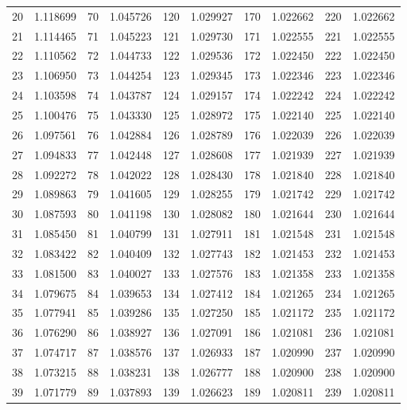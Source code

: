 \documentclass{article}
\begin{document}
\begin{table}
\begin{tabular}{*{10}{c}}
        20 & 1.118699 & 70 & 1.045726 & 120 & 1.029927 & 170 & 1.022662 & 220 & 1.022662 \\
        21 & 1.114465 & 71 & 1.045223 & 121 & 1.029730 & 171 & 1.022555 & 221 & 1.022555 \\
        22 & 1.110562 & 72 & 1.044733 & 122 & 1.029536 & 172 & 1.022450 & 222 & 1.022450 \\
        23 & 1.106950 & 73 & 1.044254 & 123 & 1.029345 & 173 & 1.022346 & 223 & 1.022346 \\
        24 & 1.103598 & 74 & 1.043787 & 124 & 1.029157 & 174 & 1.022242 & 224 & 1.022242 \\
        25 & 1.100476 & 75 & 1.043330 & 125 & 1.028972 & 175 & 1.022140 & 225 & 1.022140 \\
        26 & 1.097561 & 76 & 1.042884 & 126 & 1.028789 & 176 & 1.022039 & 226 & 1.022039 \\
        27 & 1.094833 & 77 & 1.042448 & 127 & 1.028608 & 177 & 1.021939 & 227 & 1.021939 \\
        28 & 1.092272 & 78 & 1.042022 & 128 & 1.028430 & 178 & 1.021840 & 228 & 1.021840 \\
        29 & 1.089863 & 79 & 1.041605 & 129 & 1.028255 & 179 & 1.021742 & 229 & 1.021742 \\
        30 & 1.087593 & 80 & 1.041198 & 130 & 1.028082 & 180 & 1.021644 & 230 & 1.021644 \\
        31 & 1.085450 & 81 & 1.040799 & 131 & 1.027911 & 181 & 1.021548 & 231 & 1.021548 \\
        32 & 1.083422 & 82 & 1.040409 & 132 & 1.027743 & 182 & 1.021453 & 232 & 1.021453 \\
        33 & 1.081500 & 83 & 1.040027 & 133 & 1.027576 & 183 & 1.021358 & 233 & 1.021358 \\
        34 & 1.079675 & 84 & 1.039653 & 134 & 1.027412 & 184 & 1.021265 & 234 & 1.021265 \\
        35 & 1.077941 & 85 & 1.039286 & 135 & 1.027250 & 185 & 1.021172 & 235 & 1.021172 \\
        36 & 1.076290 & 86 & 1.038927 & 136 & 1.027091 & 186 & 1.021081 & 236 & 1.021081 \\
        37 & 1.074717 & 87 & 1.038576 & 137 & 1.026933 & 187 & 1.020990 & 237 & 1.020990 \\
        38 & 1.073215 & 88 & 1.038231 & 138 & 1.026777 & 188 & 1.020900 & 238 & 1.020900 \\
        39 & 1.071779 & 89 & 1.037893 & 139 & 1.026623 & 189 & 1.020811 & 239 & 1.020811 \\

\end{tabular}
\end{table}
\end{document}
